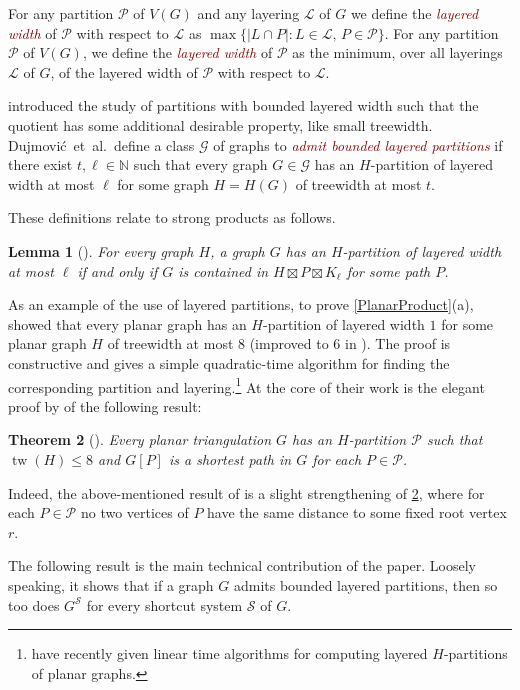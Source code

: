 \documentclass{patmorin}
\theoremstyle{plain}
\newtheorem{thm}{Theorem}
\newtheorem{lem}[thm]{Lemma}
\theoremstyle{definition}
\newcommand{\defin}[1]{\textcolor{Maroon}{\emph{#1}}}
\DeclareMathOperator{\tw}{tw}
\newcommand{\PP}{\mathcal{P}}
\renewcommand{\SS}{\mathcal{S}}
\renewcommand{\leq}{\leqslant}
\begin{document}
For any partition $\PP$ of $V(G)$ and any layering $\mathcal{L}$ of $G$ we define the \defin{layered width} of $\PP$ with respect to $\mathcal{L}$ as $\max\{|L\cap P|: L\in\mathcal{L},\, P\in\PP\}$.  For any partition $\PP$ of $V(G)$, we define the \defin{layered width} of $\PP$ as the minimum, over all layerings $\mathcal{L}$ of $G$, of the layered width of $\PP$ with respect to $\mathcal{L}$.

\citet{DJMMUW20} introduced the study of partitions with bounded layered width such that the quotient has some additional desirable property, like small treewidth. Dujmovi\'c~et~al.\ define a class $\mathcal{G}$ of graphs to \defin{admit bounded layered partitions} if there exist $t,\ell\in\mathbb{N}$ such that every graph $G\in \mathcal{G}$ has an $H$-partition of layered width at most $\ell$ for some graph $H=H(G)$ of treewidth at most $t$.

These definitions relate to strong products as follows.

\begin{lem}[\citep{DJMMUW20}]
\label{PartitionProduct}
For every graph $H$, a graph $G$ has an $H$-partition of layered width at most $\ell$ if and only if $G$ is contained in $H \boxtimes P \boxtimes K_\ell$ for some path $P$.
\end{lem}

As an example of the use of layered partitions, to prove \cref{PlanarProduct}(a),
\citet{DJMMUW20} showed that every planar graph has an $H$-partition of layered width $1$ for some planar graph $H$ of treewidth at most $8$ (improved to $6$ in \cite{UWY}). The proof is constructive and gives a simple quadratic-time algorithm for finding the corresponding partition and layering.\footnote{\citet{bose.morin.ea:optimal} have recently given linear time algorithms for computing layered $H$-partitions of planar graphs.} At the core of their work is the elegant proof by \citet{PS21} of the following result:

\begin{thm}[\citep{PS21}]
\label{ps}
  Every planar triangulation $G$ has an $H$-partition $\PP$ such that $\tw(H)\leq 8$ and $G[P]$ is a shortest path in $G$ for each $P\in\PP$.
\end{thm}

Indeed, the above-mentioned result of \citet{DJMMUW20} is a slight strengthening of \cref{ps}, where for each $P\in\PP$ no two vertices of $P$ have the same distance to some fixed root vertex $r$.

The following result is the main technical contribution of the paper. Loosely speaking, it shows that if a graph $G$ admits bounded layered partitions, then so too does $G^\SS$ for every shortcut system $\SS$ of $G$.
\end{document}

